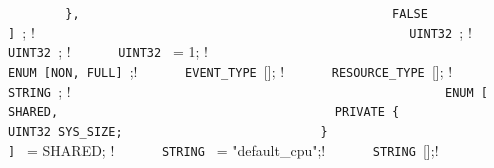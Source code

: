 {{{{{{{{{\lstinline!        },                                   ! \newline
\lstinline!        FALSE                                ! \newline
\lstinline!      ] !;              ! \newline
\lstinline!                                             ! \newline
\lstinline!      UINT32 !;          ! \newline
\lstinline!      UINT32 !;          ! \newline
\lstinline!      UINT32 ! = 1;    ! \newline
\lstinline!                                             ! \newline
\lstinline!      ENUM [NON, FULL] !;! \newline
\lstinline!      EVENT_TYPE ![];       ! \newline
\lstinline!      RESOURCE_TYPE ![]; ! \newline
\lstinline!                                             ! \newline
\lstinline!      STRING !;                       ! \newline
\lstinline!                                             ! \newline
\lstinline!      ENUM [                                 ! \newline
\lstinline!        SHARED,                              ! \newline
\lstinline!        PRIVATE {                            ! \newline
\lstinline!          UINT32 SYS_SIZE;                   ! \newline
\lstinline!        }                                    ! \newline
\lstinline!      ] ! = SHARED;         ! \newline
\lstinline!      STRING ! = "default_cpu";! \newline
\lstinline!      STRING ![];! \newline
\lstinline!                                             ! \newline
}}}}}}}}}
